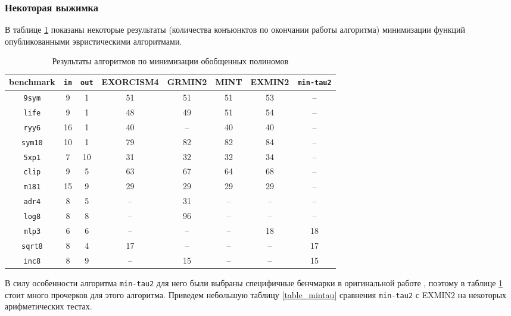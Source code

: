 \documentclass[a4paper,12pt,titlepage,finall]{article}
\begin{document}
\subsubsection{Некоторая выжимка}

В таблице \ref{table_benchmark} показаны некоторые результаты (количества конъюнктов по окончании работы алгоритма) минимизации функций опубликованными эвристическими алгоритмами.

\begin{table}[h!]
\centering
\begin{tabular}{ |c||c|c||c|c|c|c|c| }
\hline
\textbf{benchmark} & \texttt{\bf in} & \texttt{\bf out} & \textsc{EXORCISM4} & \textsc{GRMIN2} & \textsc{MINT} & \textsc{EXMIN2} & \texttt{min-tau2} \\
\hline\hline
\texttt{9sym}   & 9  & 1  & 51 & 51 & 51 & 53 & – \\
\hline
\texttt{life}   & 9  & 1  & 48 & 49 & 51 & 54 & – \\
\hline
\texttt{ryy6}   & 16 & 1  & 40 & –  & 40 & 40 & – \\
\hline
\texttt{sym10}  & 10 & 1  & 79 & 82 & 82 & 84 & – \\
\hline\hline
\texttt{5xp1}   & 7  & 10 & 31 & 32 & 32 & 34 & – \\
\hline
\texttt{clip}   & 9  & 5  & 63 & 67 & 64 & 68 & – \\
\hline
\texttt{m181}   & 15 & 9  & 29 & 29 & 29 & 29 & – \\
\hline\hline
\texttt{adr4}   & 8  & 5  & –  & 31 & –  & –  & – \\
\hline
\texttt{log8}   & 8  & 8  & –  & 96 & –  & –  & – \\
\hline
\texttt{mlp3}   & 6  & 6  & –  & –  & –  & 18 & 18 \\
\hline
\texttt{sqrt8}  & 8  & 4  & 17 & –  & –  & –  & 17 \\
\hline
\texttt{inc8}   & 8  & 9  & –  & 15 & –  & –  & 15 \\
\hline
\end{tabular}
\caption{Результаты алгоритмов по минимизации обобщенных полиномов}
\label{table_benchmark}
\end{table}

В силу особенности алгоритма \texttt{min-tau2} для него были выбраны специфичные бенчмарки в оригинальной работе \cite{min-tau2}, поэтому в таблице \ref{table_benchmark} стоит много прочерков для этого алгоритма. Приведем небольшую таблицу \ref{table_mintau} сравнения \texttt{min-tau2} с \textsc{EXMIN2} на некоторых арифметических тестах.
\end{document}
